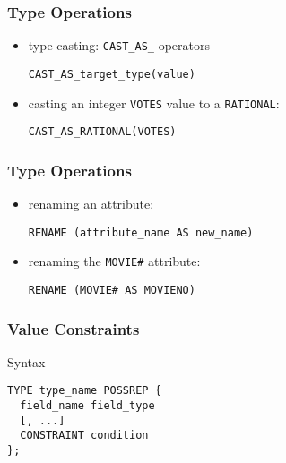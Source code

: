 \documentclass[dvipsnames]{beamer}
\theoremstyle{plain}
\begin{document}
\begin{frame}[fragile]
  \frametitle{Type Operations}

  \begin{itemize}
    \item type casting: \lstinline!CAST_AS_! operators
    \begin{lstlisting}
CAST_AS_target_type(value)
    \end{lstlisting}
  \end{itemize}

  \begin{example}
    \begin{itemize}
      \item casting an integer \texttt{VOTES} value to a \texttt{RATIONAL}:
      \begin{lstlisting}
CAST_AS_RATIONAL(VOTES)
      \end{lstlisting}
    \end{itemize}
  \end{example}
\end{frame}

\begin{frame}[fragile]
  \frametitle{Type Operations}

  \begin{itemize}
    \item renaming an attribute:
    \begin{lstlisting}
RENAME (attribute_name AS new_name)
    \end{lstlisting}
  \end{itemize}

  \begin{example}
    \begin{itemize}
      \item renaming the \texttt{MOVIE\#} attribute:
      \begin{lstlisting}
RENAME (MOVIE# AS MOVIENO)
      \end{lstlisting}
    \end{itemize}
  \end{example}
\end{frame}

\begin{frame}[fragile]
  \frametitle{Value Constraints}

  \begin{block}{Syntax}
    \begin{lstlisting}
TYPE type_name POSSREP {
  field_name field_type
  [, ...]
  CONSTRAINT condition
};
    \end{lstlisting}
  \end{block}
\end{frame}
\end{document}
